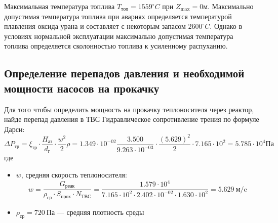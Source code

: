 Максимальная температура топлива $T_{\text{топ}} = 1559 ^\circ C$ при $Z_{\text{max}} = 0 \text{м}$. Максимально допустимая температура топлива при авариях определяется температурой плавления оксида урана и составляет с некоторым запасом $2600 ^\circ C$. Однако в условиях нормальной эксплуатации максимально допустимая температура топлива определяется сколонностью топлива к усиленному распуханию. %

\subsection{Определение перепадов давления и необходимой мощности насосов на прокачку}
Для того чтобы определить мощность на прокачку теплоносителя через реактор, найде перепад давления в ТВС
\noindent Гидравлическое сопротивление трения по формуле Дарси:
$$
\Delta P_{\text{тр}}=\xi_{\text{тр}}\cdot\frac{H_{\text{аз}}}{d_{\text{г}}}\cdot \frac {w^2}{2}\rho
=
1.349 \cdot 10^{ -02 } \frac {3.500 } {9.263 \cdot 10^{ -03 }} \cdot \frac {(5.629 )^2} {2} \cdot 7.165 \cdot 10^{ 2 }
=5.785 \cdot 10^{ 4 } \text{Па}
$$
где 
\begin{itemize}
\item $w$, средняя скорость теплоносителя: \begin{equation}w = \frac{G_{\text{реак}}}{\rho_{\text{ср}} \cdot S_{\text{прох}} \cdot N_{\text{ТВС}}}= \frac {1.579 \cdot 10^{ 4 }} {7.165 \cdot 10^{ 2 } \cdot 2.402 \cdot 10^{ -02 } \cdot 1.630 \cdot 10^{ 2 }} = 5.629 \ \text{м} /\text{c}\end{equation}
\item $\rho_{\text{ср}} = 720\ \text{Па}$ — средняя плотность среды
\end{itemize}

